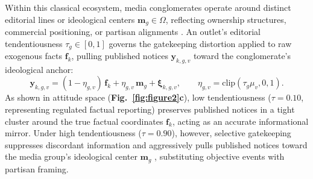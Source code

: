 \documentclass{article}
\begin{document}
Within this classical ecosystem, media conglomerates operate around distinct editorial lines or ideological centers $\mathbf{m}_g \in \Omega$, reflecting ownership structures, commercial positioning, or partisan alignments \citep{mullainathan2005market, gentzkow2006media}. An outlet's editorial tendentiousness $\tau_g \in [0, 1]$ governs the gatekeeping distortion applied to raw exogenous facts $\mathbf{f}_k$, pulling published notices $\mathbf{y}_{k,g,v}$ toward the conglomerate's ideological anchor:
\begin{equation}
    \mathbf{y}_{k,g,v} = (1 - \eta_{g,v})\,\mathbf{f}_k + \eta_{g,v}\,\mathbf{m}_g + \boldsymbol{\xi}_{k,g,v}, \qquad \eta_{g,v} = \mathrm{clip}(\tau_g \mu_v, 0, 1).
    \label{eq:tendentiousness_projection}
\end{equation}
As shown in attitude space (\textbf{Fig.~\ref{fig:figure2}c}), low tendentiousness ($\tau = 0.10$, representing regulated factual reporting) preserves published notices in a tight cluster around the true factual coordinates $\mathbf{f}_k$, acting as an accurate informational mirror. Under high tendentiousness ($\tau = 0.90$), however, selective gatekeeping suppresses discordant information and aggressively pulls published notices toward the media group's ideological center $\mathbf{m}_g$ \citep{lord1979biased, puglisi2015newspaper}, substituting objective events with partisan framing.
\end{document}
